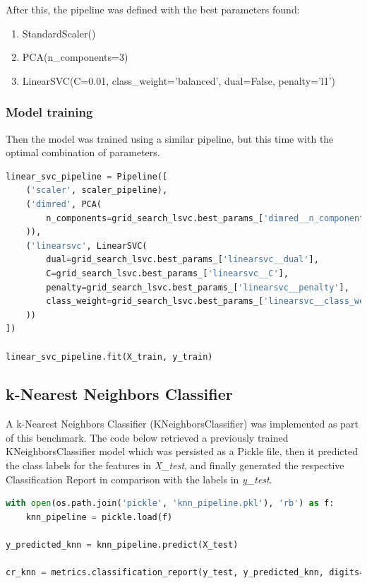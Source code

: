 \documentclass{article}
\begin{document}
After this, the pipeline was defined with the best parameters found:
\begin{enumerate}
    \item StandardScaler()
    \item PCA(n\_components=3)
    \item LinearSVC(C=0.01, class\_weight='balanced', dual=False, penalty='l1')
\end{enumerate}

\subsubsection{Model training}
Then the model was trained using a similar pipeline, but this time with the optimal combination of parameters.

\begin{lstlisting}[language=Python]
linear_svc_pipeline = Pipeline([
    ('scaler', scaler_pipeline), 
    ('dimred', PCA(
        n_components=grid_search_lsvc.best_params_['dimred__n_components']
    )),
    ('linearsvc', LinearSVC(
        dual=grid_search_lsvc.best_params_['linearsvc__dual'],
        C=grid_search_lsvc.best_params_['linearsvc__C'],
        penalty=grid_search_lsvc.best_params_['linearsvc__penalty'],
        class_weight=grid_search_lsvc.best_params_['linearsvc__class_weight']
    ))
])

linear_svc_pipeline.fit(X_train, y_train)
\end{lstlisting}

\subsection{k-Nearest Neighbors Classifier}
A k-Nearest Neighbors Classifier (KNeighborsClassifier) was implemented as part of this benchmark. The code below retrieved a previously trained KNeighborsClassifier model which was persisted as a Pickle file, then it predicted the class labels for the features in \emph{X\_test}, and finally generated the respective Classification Report in comparison with the labels in \emph{y\_test}.

\begin{lstlisting}[language=Python]
with open(os.path.join('pickle', 'knn_pipeline.pkl'), 'rb') as f:    
    knn_pipeline = pickle.load(f)
    
y_predicted_knn = knn_pipeline.predict(X_test)

cr_knn = metrics.classification_report(y_test, y_predicted_knn, digits=5)    
\end{lstlisting}
\end{document}
